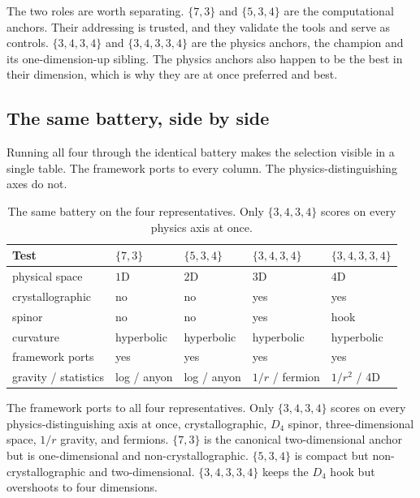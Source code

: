 The two roles are worth separating. $\{7,3\}$ and $\{5,3,4\}$ are the computational anchors. Their addressing is
trusted, and they validate the tools and serve as controls. $\{3,4,3,4\}$ and $\{3,4,3,3,4\}$ are the physics
anchors, the champion and its one-dimension-up sibling. The physics anchors also happen to be the best in their
dimension, which is why they are at once preferred and best.

\subsection{The same battery, side by side}

Running all four through the identical battery makes the selection visible in a single table. The framework ports
to every column. The physics-distinguishing axes do not.

\begin{table}[ht]
\centering
\begin{tabular}{p{3.3cm}p{2.0cm}p{2.0cm}p{2.4cm}p{2.2cm}}
\toprule
Test & $\{7,3\}$ & $\{5,3,4\}$ & $\{3,4,3,4\}$ & $\{3,4,3,3,4\}$ \\
\midrule
physical space & $1$D & $2$D & $3$D & $4$D \\
crystallographic & no & no & yes & yes \\
spinor & no & no & yes & hook \\
curvature & hyperbolic & hyperbolic & hyperbolic & hyperbolic \\
framework ports & yes & yes & yes & yes \\
gravity / statistics & log / anyon & log / anyon & $1/r$ / fermion & $1/r^2$ / 4D \\
\bottomrule
\end{tabular}
\caption{The same battery on the four representatives. Only $\{3,4,3,4\}$ scores on every physics axis at once.}
\end{table}

\begin{result}
The framework ports to all four representatives. Only $\{3,4,3,4\}$ scores on every physics-distinguishing axis
at once, crystallographic, $D_4$ spinor, three-dimensional space, $1/r$ gravity, and fermions. $\{7,3\}$ is the
canonical two-dimensional anchor but is one-dimensional and non-crystallographic. $\{5,3,4\}$ is compact but
non-crystallographic and two-dimensional. $\{3,4,3,3,4\}$ keeps the $D_4$ hook but overshoots to four
dimensions. \cite{pollard2026vibetest}
\end{result}

